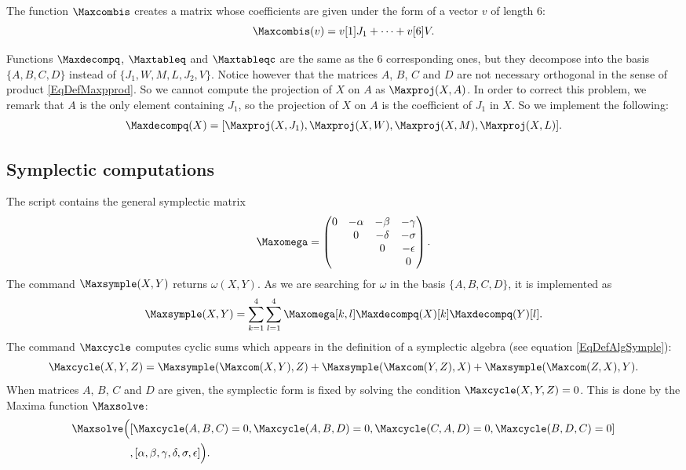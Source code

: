 The function $\Maxcombis$ creates a matrix whose coefficients are given under the form of a vector $v$ of length $6$:
\[
  \Maxcombis(v)=v[1]J_{1}+\cdots+v[6]V.
\]

Functions $\Maxdecompq$, $\Maxtableq$ and $\Maxtableqc$ are the same as the $6$ corresponding ones, but they decompose into the basis $\{A,B,C,D\}$ instead of  $\{ J_{1},W,M,L,J_{2},V \}$. Notice however that the matrices $A$, $B$, $C$ and $D$ are not necessary orthogonal in the sense of  product \eqref{EqDefMaxpprod}. So we cannot compute the projection of $X$ on $A$ as $\Maxproj(X,A)$. In order to correct this problem, we remark that $A$ is the only element containing $J_{1}$, so the projection of $X$ on $A$ is the coefficient of $J_{1}$ in $X$. So we implement the following:
\[
  \Maxdecompq(X)=[\Maxproj(X,J_{1}),\Maxproj(X,W),\Maxproj(X,M),\Maxproj(X,L)].
\]



\subsection{Symplectic computations}

The script  contains the general symplectic matrix
\[
  \Maxomega=\begin{pmatrix}
 0	&	-\alpha	&-\beta&-\gamma\\
&0&-\delta&-\sigma\\
&&0&-\epsilon\\
&&&0
\end{pmatrix}.
\]
The command $\Maxsymple(X,Y)$ returns $\omega(X,Y)$. As we are searching for $\omega$ in the basis $\{ A,B,C,D \}$, it is implemented as
\[
  \Maxsymple(X,Y)=\sum_{k=1}^{4}\sum_{l=1}^{4}\Maxomega[k,l]\Maxdecompq(X)[k]\Maxdecompq(Y)[l].
\]
The command $\Maxcycle$ computes cyclic sums which appears in the definition of a symplectic algebra (see equation \eqref{EqDefAlgSymple}):
\begin{equation}
\Maxcycle(X,Y,Z)=\Maxsymple(\Maxcom(X,Y),Z)+\Maxsymple(\Maxcom(Y,Z),X)+\Maxsymple(\Maxcom(Z,X),Y).
\end{equation}
When matrices $A$, $B$, $C$ and $D$ are given, the symplectic form is fixed by solving the condition $\Maxcycle(X,Y,Z)=0$. This is done by the Maxima function $\Maxsolve$:
\[
\begin{split}
\Maxsolve\Big(&  [\Maxcycle(A,B,C)=0,\Maxcycle(A,B,D)=0,\Maxcycle(C,A,D)=0,\Maxcycle(B,D,C)=0]\\
		&,[\alpha,\beta,\gamma,\delta,\sigma,\epsilon] \Big).
\end{split}
\]

